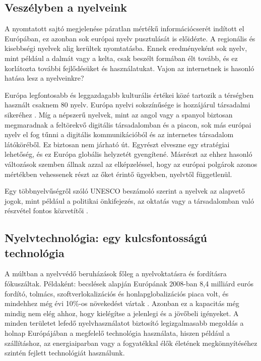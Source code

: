 \begin{multicols}{2}
  \subsection{Veszélyben a nyelveink}

  A nyomtatott sajtó megjelenése páratlan mértékű információcserét indított el Európában, ez azonban sok európai nyelv pusztulását is előidézte. A regionális és kisebbségi nyelvek alig kerültek nyom\-ta\-tás\-ba. Ennek eredményeként sok nyelv, mint például a dalmát vagy a kelta, csak beszélt formában élt tovább, és ez korlátozta további fejlődésüket és használatukat. Vajon az internetnek is hasonló hatása lesz a nyelveinkre?

  Európa legfontosabb és leggazdagabb kulturális értékei közé tartozik a térségben használt csaknem 80 nyelv. Európa nyelvi sokszínűsége is hozzájárul társadalmi si\-ke\-ré\-hez \cite{EC2}.  Míg a népszerű nyelvek, mint az angol vagy a spanyol biztosan megmaradnak a feltörekvő digitális társadalomban és a piacon, sok más európai nyelv el fog tűnni a digitális kommunikációból és az internetes társadalom látóköréből. Ez biztosan nem járható út. Egyrészt elveszne egy stratégiai lehetőség, és ez Európa globális helyzetét gyengítené. Másrészt az ehhez hasonló változások szemben állnak azzal az elképzeléssel, hogy az európai polgárok azonos mértékben vehessenek részt az őket érintő ügyekben, nyelvtől függetlenül.


  Egy többnyelvűségről szóló UNESCO beszámoló szerint a nyelvek az alapvető jogok, mint például a politikai önkifejezés, az oktatás vagy a társadalomban való részvétel fontos közvetítői \cite{Unesco1}.

  \subsection{Nyelvtechnológia: egy kulcsfontosságú technológia}

  A múltban a nyelvvédő beruházások főleg a nyelvoktatásra és fordításra fókuszáltak. Példaként: becslések alapján Európának 2008-ban 8,4 milliárd eurós fordító, tolmács, szoftverlokalizációs és honlapglobalizációs piaca volt, és mindehhez még évi 10\%-os növekedést vártak \cite{EC3}. Azonban ez a kapacitás még mindig nem elég ahhoz, hogy kielégítse a jelenlegi és a jövőbeli igényeket. A minden területet lefedő nyelvhasználatot biztosító legizgalmasabb megoldás a holnap Európájában a megfelelő technológia használata, hiszen például a szállításhoz, az energiaiparban vagy a fogyatékkal élők életének megkönnyítéséhez szintén fejlett technológiát használunk.


\end{multicols}
